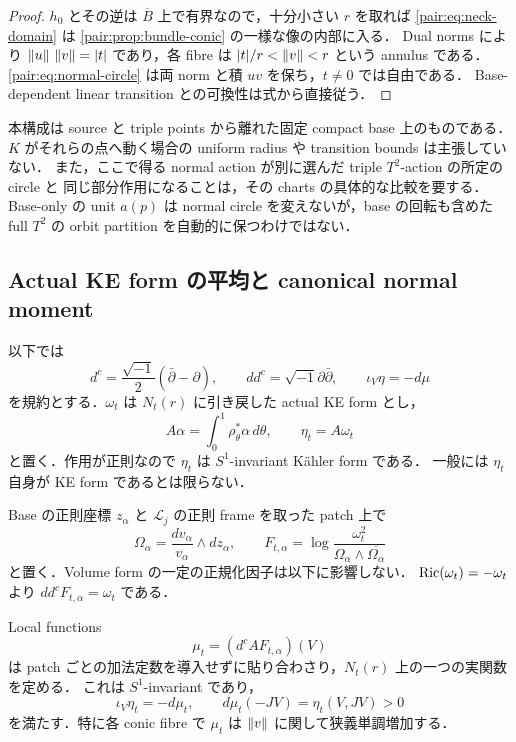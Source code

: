 \begin{proof}
$h_0$ とその逆は $\overline B$ 上で有界なので，十分小さい $r$ を取れば
\eqref{pair:eq:neck-domain} は \cref{pair:prop:bundle-conic} の一様な像の内部に入る．
Dual norms により $\left\lVert u\right\rVert\,\left\lVert v\right\rVert=|t|$ であり，各 fibre は
$|t|/r<\left\lVert v\right\rVert<r$ という annulus である．
\eqref{pair:eq:normal-circle} は両 norm と積 $uv$ を保ち，$t\ne0$ では自由である．
Base-dependent linear transition との可換性は式から直接従う．
\end{proof}

\begin{remark}
本構成は source と triple points から離れた固定 compact base 上のものである．
$K$ がそれらの点へ動く場合の uniform radius や transition bounds は主張していない．
また，ここで得る normal action が別に選んだ triple $T^2$-action の所定の circle と
同じ部分作用になることは，その charts の具体的な比較を要する．
Base-only の unit $a(p)$ は normal circle を変えないが，base の回転も含めた
full $T^2$ の orbit partition を自動的に保つわけではない．
\end{remark}

\subsection{Actual KE form の平均と canonical normal moment}

以下では
\[
 d^c=\frac{\sqrt{-1}}2(\bar\partial-\partial),\qquad
 dd^c=\sqrt{-1}\partial\bar\partial,
 \qquad \iota_V\eta=-d\mu
\]
を規約とする．$\omega_t$ は $N_t(r)$ に引き戻した actual KE form とし，
\begin{equation}\label{pair:eq:normal-average}
 A\alpha=\int_0^1\rho_\theta^*\alpha\,d\theta,
 \qquad \eta_t=A\omega_t
\end{equation}
と置く．作用が正則なので $\eta_t$ は $S^1$-invariant Kähler form である．
一般には $\eta_t$ 自身が KE form であるとは限らない．

Base の正則座標 $z_\alpha$ と $\mathcal L_j$ の正則 frame を取った patch 上で
\begin{equation}\label{pair:eq:canonical-potential}
 \Omega_\alpha=\frac{dv_\alpha}{v_\alpha}\wedge dz_\alpha,
 \qquad
 F_{t,\alpha}=\log\frac{\omega_t^2}{\Omega_\alpha\wedge\overline{\Omega_\alpha}}
\end{equation}
と置く．Volume form の一定の正規化因子は以下に影響しない．
$\operatorname{Ric}(\omega_t)=-\omega_t$ より $dd^cF_{t,\alpha}=\omega_t$ である．

\begin{proposition}
\label{pair:prop:canonical-normal-moment}
Local functions
\begin{equation}\label{pair:eq:canonical-moment}
 \mu_t=(d^cAF_{t,\alpha})(V)
\end{equation}
は patch ごとの加法定数を導入せずに貼り合わさり，$N_t(r)$ 上の一つの実関数を定める．
これは $S^1$-invariant であり，
\begin{equation}\label{pair:eq:moment-monotonicity}
 \iota_V\eta_t=-d\mu_t,
 \qquad d\mu_t(-JV)=\eta_t(V,JV)>0
\end{equation}
を満たす．特に各 conic fibre で $\mu_t$ は $\left\lVert v\right\rVert$ に関して狭義単調増加する．
\end{proposition}

